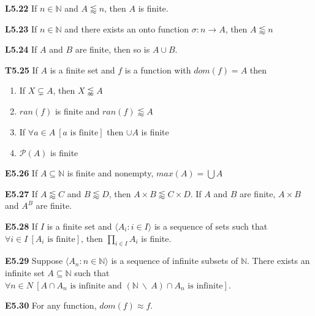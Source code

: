 \documentclass[10pt, landscape]{article}
\begin{document}
\begin{multicols*}{3}
\textbf{L5.22} If $n \in \mathbb{N}$ and $A \lessapprox n$, then $A$ is finite.

\textbf{L5.23} If $n \in \mathbb{N}$ and there exists an onto function $\sigma : n \rightarrow A$, then $A \lessapprox n$

\textbf{L5.24} If $A$ and $B$ are finite, then so is $A \cup B$.

\textbf{T5.25} If $A$ is a finite set and $f$ is a function with $dom(f)=A$ then
\begin{enumerate}
    \item If $X \subsetneq A$, then $X \lnapprox A$
    \item $ran(f)$ is finite and $ran(f) \lessapprox A$
    \item If $\forall a \in A \ [a \text{ is finite}]$ then $\cup A $ is finite
    \item $\mathcal{P}(A)$ is finite
\end{enumerate}

\textbf{E5.26} If $A \subseteq \mathbb{N}$ is finite and nonempty, $max(A)=\bigcup A$

\textbf{E5.27} If $A \lessapprox C$ and $B \lessapprox D$, then $A \times B \lessapprox C \times D$. If $A$ and $B$ are finite, $A \times B$ and $A^B$ are finite.

\textbf{E5.28} If $I$ is a finite set and $\langle A_i:i \in I \rangle$ is a sequence of sets such that $\forall i \in I \ [A_i \text{ is finite}]$, then $\prod_{i \in I} A_i$ is finite.

\textbf{E5.29} Suppose $\langle A_n : n \in \mathbb{N} \rangle$ is a sequence of infinite subsets of $\mathbb{N}$. There exists an infinite set $A \subseteq \mathbb{N}$ such that $\forall n \in N \ [A \cap A_n \text{ is infinite and } (\mathbb{N} \ \backslash \ A) \cap A_n \text{ is infinite}]$.

\textbf{E5.30} For any function, $dom(f) \approx f$.


\end{multicols*}
\end{document}
